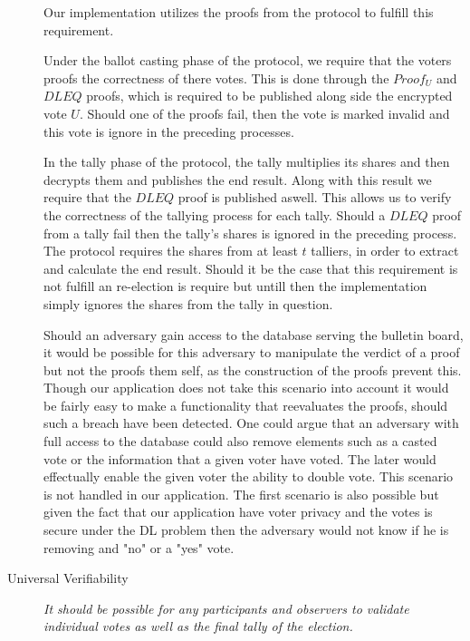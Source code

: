 \begin{description}
        \noindent
        Our implementation utilizes the proofs from the protocol to fulfill this requirement. 
        
        \noindent
        Under the ballot casting phase of the protocol, we require that the voters proofs the correctness of there votes. This is done through the $Proof_U$ and $DLEQ$ proofs, which is required to be published along side the encrypted vote $U$. Should one of the proofs fail, then the vote is marked invalid and this vote is ignore in the preceding processes. 
        
        \noindent
        In the tally phase of the protocol, the tally multiplies its shares and then decrypts them and publishes the end result. Along with this result we require that the $DLEQ$ proof is published aswell. This allows us to verify the correctness of the tallying process for each tally. Should a $DLEQ$ proof from a tally fail then the tally's shares is ignored in the preceding process. The protocol requires the shares from at least $t$ talliers, in order to extract and calculate the end result. Should it 
        be the case that this requirement is not fulfill an re-election is require but untill then the implementation simply ignores the shares from the tally in question.
        
        \noindent
        Should an adversary gain access to the database serving the bulletin board, it would be possible for this adversary to manipulate the verdict of a proof but not
        the proofs them self, as the construction of the proofs prevent this. Though our application does not take this scenario into account it would be fairly easy to make
        a functionality that reevaluates the proofs, should such a breach have been detected. One could argue that an adversary with full access to the database could also remove elements such as a casted vote or the information that a given voter have voted. The later would effectually enable the given voter the ability to double vote. This scenario is not handled in our application. The first scenario is also possible but given the fact that our application have voter privacy and the votes is secure under the DL problem then the adversary would not know if he is removing and "no" or a "yes" vote. 
        
        
    \item[Universal Verifiability]
        \textit{It should be possible for any participants and observers to validate individual votes as well as the final tally of the election.}
        

\end{description}

